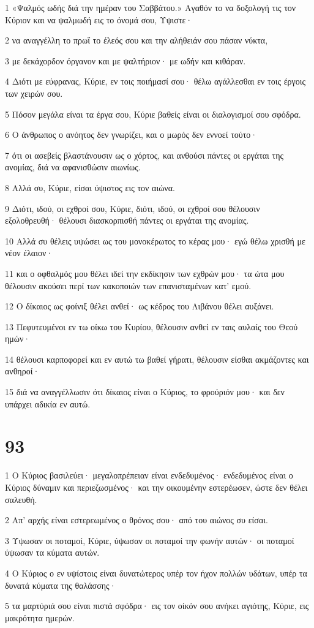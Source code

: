\par 1 «Ψαλμός ωδής διά την ημέραν του Σαββάτου.» Αγαθόν το να δοξολογή τις τον Κύριον και να ψαλμωδή εις το όνομά σου, Υψιστε·
\par 2 να αναγγέλλη το πρωΐ το έλεός σου και την αλήθειάν σου πάσαν νύκτα,
\par 3 με δεκάχορδον όργανον και με ψαλτήριον· με ωδήν και κιθάραν.
\par 4 Διότι με εύφρανας, Κύριε, εν τοις ποιήμασί σου· θέλω αγάλλεσθαι εν τοις έργοις των χειρών σου.
\par 5 Πόσον μεγάλα είναι τα έργα σου, Κύριε βαθείς είναι οι διαλογισμοί σου σφόδρα.
\par 6 Ο άνθρωπος ο ανόητος δεν γνωρίζει, και ο μωρός δεν εννοεί τούτο·
\par 7 ότι οι ασεβείς βλαστάνουσιν ως ο χόρτος, και ανθούσι πάντες οι εργάται της ανομίας, διά να αφανισθώσιν αιωνίως.
\par 8 Αλλά συ, Κύριε, είσαι ύψιστος εις τον αιώνα.
\par 9 Διότι, ιδού, οι εχθροί σου, Κύριε, διότι, ιδού, οι εχθροί σου θέλουσιν εξολοθρευθή· θέλουσι διασκορπισθή πάντες οι εργάται της ανομίας.
\par 10 Αλλά συ θέλεις υψώσει ως του μονοκέρωτος το κέρας μου· εγώ θέλω χρισθή με νέον έλαιον·
\par 11 και ο οφθαλμός μου θέλει ιδεί την εκδίκησιν των εχθρών μου· τα ώτα μου θέλουσιν ακούσει περί των κακοποιών των επανισταμένων κατ' εμού.
\par 12 Ο δίκαιος ως φοίνιξ θέλει ανθεί· ως κέδρος του Λιβάνου θέλει αυξάνει.
\par 13 Πεφυτευμένοι εν τω οίκω του Κυρίου, θέλουσιν ανθεί εν ταις αυλαίς του Θεού ημών·
\par 14 θέλουσι καρποφορεί και εν αυτώ τω βαθεί γήρατι, θέλουσιν είσθαι ακμάζοντες και ανθηροί·
\par 15 διά να αναγγέλλωσιν ότι δίκαιος είναι ο Κύριος, το φρούριόν μου· και δεν υπάρχει αδικία εν αυτώ.

\chapter{93}

\par 1 Ο Κύριος βασιλεύει· μεγαλοπρέπειαν είναι ενδεδυμένος· ενδεδυμένος είναι ο Κύριος δύναμιν και περιεζωσμένος· και την οικουμένην εστερέωσεν, ώστε δεν θέλει σαλευθή.
\par 2 Απ' αρχής είναι εστερεωμένος ο θρόνος σου· από του αιώνος συ είσαι.
\par 3 Ύψωσαν οι ποταμοί, Κύριε, ύψωσαν οι ποταμοί την φωνήν αυτών· οι ποταμοί ύψωσαν τα κύματα αυτών.
\par 4 Ο Κύριος ο εν υψίστοις είναι δυνατώτερος υπέρ τον ήχον πολλών υδάτων, υπέρ τα δυνατά κύματα της θαλάσσης·
\par 5 τα μαρτύριά σου είναι πιστά σφόδρα· εις τον οίκόν σου ανήκει αγιότης, Κύριε, εις μακρότητα ημερών.

